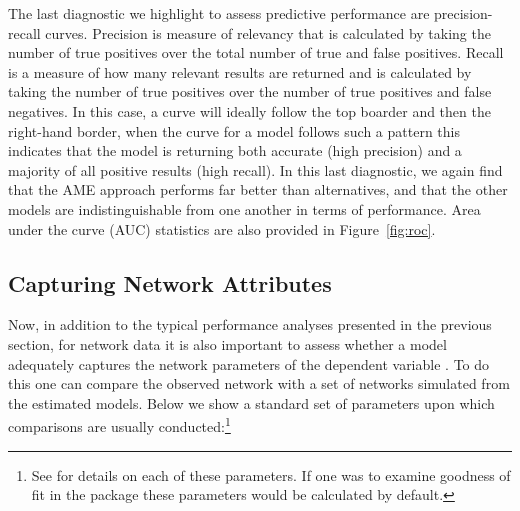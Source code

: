 The last diagnostic we highlight to assess predictive performance are precision-recall curves. Precision is measure of relevancy that is calculated by taking the number of true positives over the total number of true and false positives. Recall is a measure of how many relevant results are returned and is calculated by taking the number of true positives over the number of true positives and false negatives. In this case, a curve will ideally follow the top boarder and then the right-hand border, when the curve for a model follows such a pattern this indicates that the model is returning both accurate (high precision) and a majority of all positive results (high recall). In this last diagnostic, we again find that the AME approach performs far better than alternatives, and that the other models are indistinguishable from one another in terms of performance. Area under the curve (AUC) statistics are also provided in Figure~\ref{fig:roc}.

\subsection{Capturing Network Attributes}

Now, in addition to the typical performance analyses presented in the previous section, for network data it is also important to assess whether a model adequately captures the network parameters of the dependent variable \citep{hunter:etal:2008}. To do this one can compare the observed network with a set of networks simulated from the estimated models. Below we show a standard set of parameters upon which comparisons are usually conducted:\footnote{See \citet{morris:etal:2008} for details on each of these parameters. If one was to examine goodness of fit in the  package these parameters would be calculated by default.}

